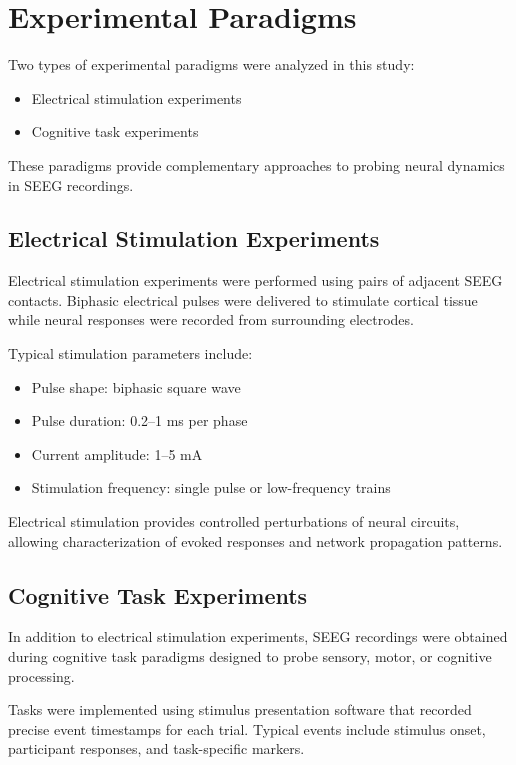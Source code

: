 \documentclass[11pt]{report}
\begin{document}
\section{Experimental Paradigms}

Two types of experimental paradigms were analyzed in this study:

\begin{itemize}
\item Electrical stimulation experiments
\item Cognitive task experiments
\end{itemize}

These paradigms provide complementary approaches to probing neural
dynamics in SEEG recordings.

\subsection{Electrical Stimulation Experiments}

Electrical stimulation experiments were performed using pairs of
adjacent SEEG contacts. Biphasic electrical pulses were delivered
to stimulate cortical tissue while neural responses were recorded
from surrounding electrodes.

Typical stimulation parameters include:

\begin{itemize}
\item Pulse shape: biphasic square wave
\item Pulse duration: 0.2--1 ms per phase
\item Current amplitude: 1--5 mA
\item Stimulation frequency: single pulse or low-frequency trains
\end{itemize}

Electrical stimulation provides controlled perturbations of neural
circuits, allowing characterization of evoked responses and network
propagation patterns.

\subsection{Cognitive Task Experiments}

In addition to electrical stimulation experiments, SEEG recordings
were obtained during cognitive task paradigms designed to probe
sensory, motor, or cognitive processing.

Tasks were implemented using stimulus presentation software that
recorded precise event timestamps for each trial. Typical events
include stimulus onset, participant responses, and task-specific
markers.
\end{document}
